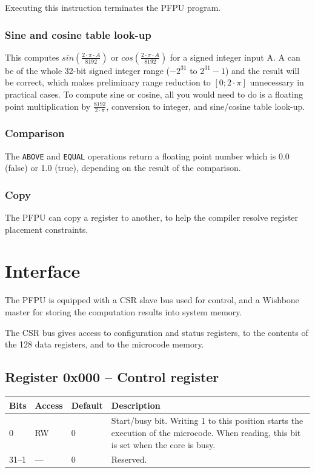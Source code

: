 \documentclass[a4paper,11pt]{article}
\begin{document}
Executing this instruction terminates the PFPU program.

\subsubsection{Sine and cosine table look-up}
This computes $sin(\frac{2 \cdot \pi \cdot A}{8192})$ or $cos(\frac{2 \cdot \pi \cdot A}{8192})$ for a signed integer input A. A can be of the whole 32-bit signed integer range ($-2^{31}$ to $2^{31}-1$) and the result will be correct, which makes preliminary range reduction to $[0;2\cdot\pi]$ unnecessary in practical cases. To compute sine or cosine, all you would need to do is a floating point multiplication by $\frac{8192}{2 \cdot \pi}$, conversion to integer, and sine/cosine table look-up.

\subsubsection{Comparison}
The \verb!ABOVE! and \verb!EQUAL! operations return a floating point number which is 0.0 (false) or 1.0 (true), depending on the result of the comparison.

\subsubsection{Copy}
The PFPU can copy a register to another, to help the compiler resolve register placement constraints.

\section{Interface}
The PFPU is equipped with a CSR slave bus used for control, and a Wishbone master for storing the computation results into system memory.

The CSR bus gives access to configuration and status registers, to the contents of the 128 data registers, and to the microcode memory.

\subsection{Register 0x000 -- Control register}
\begin{tabularx}{\textwidth}{|l|l|l|X|}
\hline
\bf Bits & \bf Access & \bf Default & \bf Description \\
\hline
0 & RW & 0 & Start/busy bit. Writing 1 to this position starts the execution of the microcode. When reading, this bit is set when the core is busy. \\
\hline
31--1 & --- & 0 & Reserved. \\
\hline
\end{tabularx}
\end{document}
